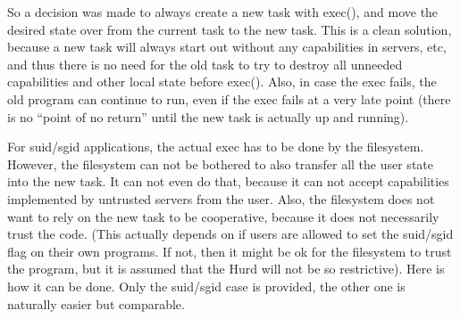 \documentclass[9pt,a4paper]{extarticle}
\begin{document}
So a decision was made to always create a new task with exec(), and
move the desired state over from the current task to the new task.
This is a clean solution, because a new task will always start out
without any capabilities in servers, etc, and thus there is no need
for the old task to try to destroy all unneeded capabilities and other
local state before exec().  Also, in case the exec fails, the old
program can continue to run, even if the exec fails at a very late
point (there is no ``point of no return'' until the new task is
actually up and running).

For suid/sgid applications, the actual exec has to be done by the
filesystem.  However, the filesystem can not be bothered to also
transfer all the user state into the new task.  It can not even do
that, because it can not accept capabilities implemented by untrusted
servers from the user.  Also, the filesystem does not want to rely on
the new task to be cooperative, because it does not necessarily trust
the code.  (This actually depends on if users are allowed to set the
suid/sgid flag on their own programs.  If not, then it might be ok for
the filesystem to trust the program, but it is assumed that the Hurd
will not be so restrictive).  Here is how it can be done.  Only the
suid/sgid case is provided, the other one is naturally easier but
comparable.
\end{document}
